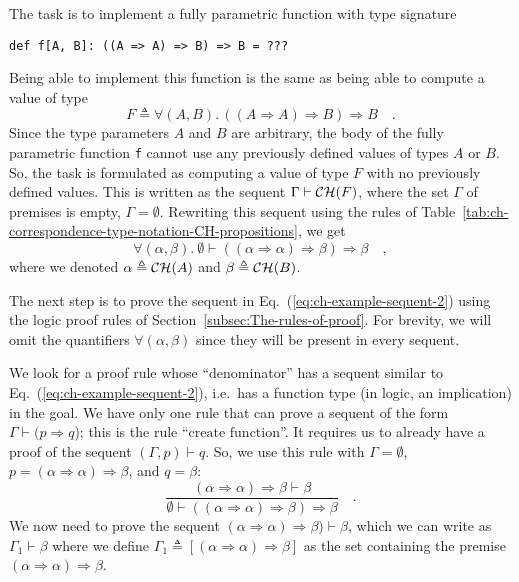 The task is to implement a fully parametric function with type signature
\begin{lstlisting}
def f[A, B]: ((A => A) => B) => B = ???
\end{lstlisting}
Being able to implement this function is the same as being able to
compute a value of type 
\[
F\triangleq\forall(A,B).\,((A\Rightarrow A)\Rightarrow B)\Rightarrow B\quad.
\]
Since the type parameters $A$ and $B$ are arbitrary, the body of
the fully parametric function \lstinline!f!
cannot use any previously defined values of types $A$ or $B$. So,
the task is formulated as computing a value of type $F$ with no previously
defined values. This is written as the sequent $\Gamma\vdash{\cal CH}(F)$,
where the set $\Gamma$ of premises is empty, $\Gamma=\emptyset$.
Rewriting this sequent using the rules of Table~\ref{tab:ch-correspondence-type-notation-CH-propositions},
we get
\begin{equation}
\forall(\alpha,\beta).\:\emptyset\vdash((\alpha\Rightarrow\alpha)\Rightarrow\beta)\Rightarrow\beta\quad,\label{eq:ch-example-sequent-2}
\end{equation}
where we denoted $\alpha\triangleq{\cal CH}(A)$ and $\beta\triangleq{\cal CH}(B)$. 

The next step is to prove the sequent in Eq.~(\ref{eq:ch-example-sequent-2})
using the logic proof rules of Section~\ref{subsec:The-rules-of-proof}.
For brevity, we will omit the quantifiers $\forall(\alpha,\beta)$
since they will be present in every sequent.

We look for a proof rule whose ``denominator'' has a sequent similar
to Eq.~(\ref{eq:ch-example-sequent-2}), i.e.~has a function type
(in logic, an implication) in the goal. We have only one rule that
can prove a sequent of the form $\Gamma\vdash(p\Rightarrow q$); this
is the rule ``$\text{create function}$''. It requires us to already
have a proof of the sequent $(\Gamma,p)\vdash q$. So, we use this
rule with $\Gamma=\emptyset$, $p=(\alpha\Rightarrow\alpha)\Rightarrow\beta$,
and $q=\beta$: 
\[
\frac{(\alpha\Rightarrow\alpha)\Rightarrow\beta\vdash\beta}{\emptyset\vdash((\alpha\Rightarrow\alpha)\Rightarrow\beta)\Rightarrow\beta}\quad.
\]
We now need to prove the sequent $(\alpha\Rightarrow\alpha)\Rightarrow\beta)\vdash\beta$,
which we can write as $\Gamma_{1}\vdash\beta$ where we define $\Gamma_{1}\triangleq[(\alpha\Rightarrow\alpha)\Rightarrow\beta]$
as the set containing the premise $(\alpha\Rightarrow\alpha)\Rightarrow\beta$. 

